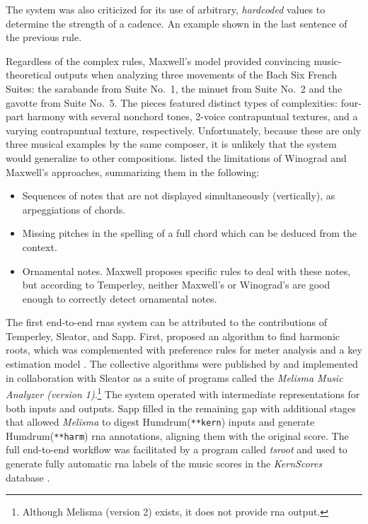 The system was also criticized for its use of arbitrary,
\emph{hardcoded} values to determine the strength of a
cadence. An example shown in the last sentence of the
previous rule.

Regardless of the complex rules, Maxwell's model provided
convincing music-theoretical outputs when analyzing three
movements of the Bach Six French Suites: the sarabande from
Suite No.~1, the minuet from Suite No.~2 and the gavotte
from Suite No.~5. The pieces featured distinct types of
complexities: four-part harmony with several nonchord tones,
2-voice contrapuntual textures, and a varying contrapuntual
texture, respectively. Unfortunately, because these are only
three musical examples by the same composer, it is unlikely
that the system would generalize to other compositions.
\textcite{temperley1997algorithm} listed the limitations of
Winograd and Maxwell's approaches, summarizing them in the
following:

\begin{itemize}
    \item Sequences of notes that are not displayed
    simultaneously (vertically), as arpeggiations of chords.
    \item Missing pitches in the spelling of a full chord
    which can be deduced from the context.
    \item Ornamental notes. Maxwell proposes specific rules
    to deal with these notes, but according to Temperley,
    neither Maxwell's or Winograd's are good enough to
    correctly detect ornamental notes.
\end{itemize}


The first end-to-end \glspl{rna} system can be attributed to
the contributions of Temperley, Sleator, and Sapp. First,
\textcite{temperley1997algorithm} proposed an algorithm to
find harmonic roots, which was complemented with preference
rules for meter analysis \parencite{temperley1999modeling}
and a key estimation model \parencite{temperley1999whats}.
The collective algorithms were published by
\textcite{temperley2004cognition} and implemented in
collaboration with Sleator as a suite of programs called the
\emph{Melisma Music Analyzer (version
1)}.\footnote{Although
Melisma (version 2) exists, it does not provide \gls{rna}
output.} The system operated with intermediate
representations for both inputs and outputs. Sapp filled in
the remaining gap with additional stages that allowed
\emph{Melisma} to digest Humdrum(\texttt{**kern}) inputs and
generate Humdrum(\texttt{**harm}) \gls{rna} annotations,
aligning them with the original score. The full end-to-end
workflow was facilitated by a program called \emph{tsroot}
\parencite{sapp2009tsroot} and used to generate fully
automatic \gls{rna} labels of the music scores in
the \emph{KernScores} database \parencite{sapp2005online}.

